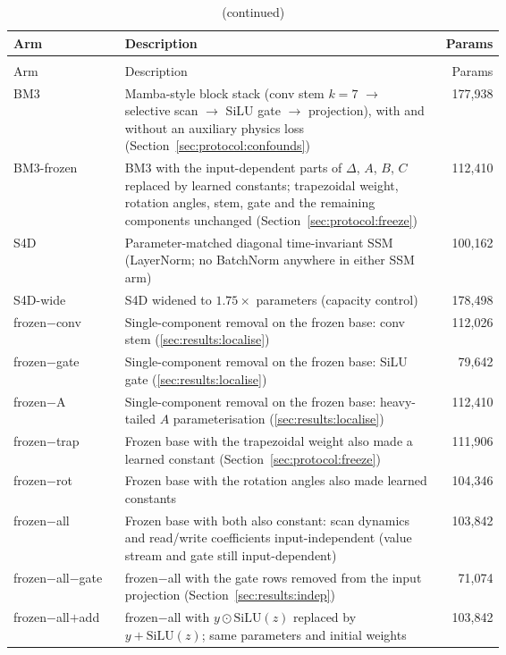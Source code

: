 \begingroup\footnotesize
\begin{longtable}{@{}lp{0.64\linewidth}r@{}}
\caption{Principal experimental arms and parameter counts.}\label{tab:arms}\\
\toprule
Arm & Description & Params \\
\midrule
\endfirsthead
\caption[]{(continued)}\\
\toprule
Arm & Description & Params \\
\midrule
\endhead
\bottomrule
\endfoot
BM3 & Mamba-style block stack (conv stem $k{=}7$ $\rightarrow$ selective scan $\rightarrow$ SiLU gate $\rightarrow$ projection), with and without an auxiliary physics loss (Section~\ref{sec:protocol:confounds}) & 177{,}938 \\
BM3-frozen & BM3 with the input-dependent parts of $\Delta$, $A$, $B$, $C$ replaced by learned constants; trapezoidal weight, rotation angles, stem, gate and the remaining components unchanged (Section~\ref{sec:protocol:freeze}) & 112{,}410 \\
S4D & Parameter-matched diagonal time-invariant SSM (LayerNorm; no BatchNorm anywhere in either SSM arm) & 100{,}162 \\
S4D-wide & S4D widened to $1.75\times$ parameters (capacity control) & 178{,}498 \\
frozen$-$conv & Single-component removal on the frozen base: conv stem (\ref{sec:results:localise}) & 112{,}026 \\
frozen$-$gate & Single-component removal on the frozen base: SiLU gate (\ref{sec:results:localise}) & 79{,}642 \\
frozen$-$A & Single-component removal on the frozen base: heavy-tailed $A$ parameterisation (\ref{sec:results:localise}) & 112{,}410 \\
frozen$-$trap & Frozen base with the trapezoidal weight also made a learned constant (Section~\ref{sec:protocol:freeze}) & 111{,}906 \\
frozen$-$rot & Frozen base with the rotation angles also made learned constants & 104{,}346 \\
frozen$-$all & Frozen base with both also constant: scan dynamics and read/write coefficients input-independent (value stream and gate still input-dependent) & 103{,}842 \\
frozen$-$all$-$gate & frozen$-$all with the gate rows removed from the input projection (Section~\ref{sec:results:indep}) & 71{,}074 \\
frozen$-$all$+$add & frozen$-$all with $y\odot\mathrm{SiLU}(z)$ replaced by $y+\mathrm{SiLU}(z)$; same parameters and initial weights & 103{,}842 \\

\end{longtable}

